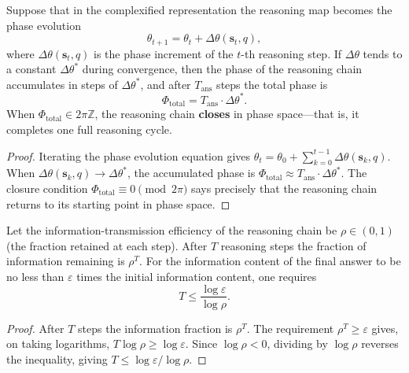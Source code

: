 \begin{proposition}\label{prop:reasoning_phase_accumulation}
Suppose that in the complexified representation the reasoning map becomes the phase evolution
\[
\theta_{t+1}=\theta_t+\Delta\theta(\mathbf{s}_t,q),
\]
where $\Delta\theta(\mathbf{s}_t,q)$ is the phase increment of the $t$-th reasoning step. If $\Delta\theta$ tends to a constant $\Delta\theta^*$ during convergence, then the phase of the reasoning chain accumulates in steps of $\Delta\theta^*$, and after $T_{\text{ans}}$ steps the total phase is
\[
\Phi_{\text{total}}=T_{\text{ans}}\cdot\Delta\theta^*.
\]
When $\Phi_{\text{total}}\in2\pi\mathbb{Z}$, the reasoning chain \textbf{closes} in phase space---that is, it completes one full reasoning cycle.
\end{proposition}

\begin{proof}
Iterating the phase evolution equation gives $\theta_t=\theta_0+\sum_{k=0}^{t-1}\Delta\theta(\mathbf{s}_k,q)$. When $\Delta\theta(\mathbf{s}_k,q)\to\Delta\theta^*$, the accumulated phase is $\Phi_{\text{total}}\approx T_{\text{ans}}\cdot\Delta\theta^*$. The closure condition $\Phi_{\text{total}}\equiv0\pmod{2\pi}$ says precisely that the reasoning chain returns to its starting point in phase space.
\end{proof}

\begin{lemma}\label{lem:reasoning_depth_information}
Let the information-transmission efficiency of the reasoning chain be $\rho\in(0,1)$ (the fraction retained at each step). After $T$ reasoning steps the fraction of information remaining is $\rho^T$. For the information content of the final answer to be no less than $\varepsilon$ times the initial information content, one requires
\[
T\le\frac{\log\varepsilon}{\log\rho}.
\]
\end{lemma}

\begin{proof}
After $T$ steps the information fraction is $\rho^T$. The requirement $\rho^T\ge\varepsilon$ gives, on taking logarithms, $T\log\rho\ge\log\varepsilon$. Since $\log\rho<0$, dividing by $\log\rho$ reverses the inequality, giving $T\le\log\varepsilon/\log\rho$.
\end{proof}

